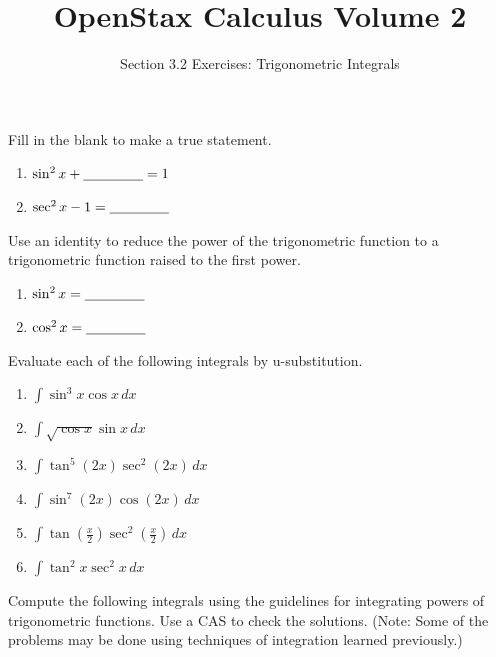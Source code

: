 \documentclass{exercises}
\title{OpenStax Calculus Volume 2}
\subtitle{Section 3.2 Exercises: Trigonometric Integrals}
\author{}
\date{}
\begin{document}
\maketitle


Fill in the blank to make a true statement.

\begin{enumerate}[start=1]
\item $\sin^{2}x+\underline{\hspace{1.5cm}}=1$
\item $\sec^{2}x-1=\underline{\hspace{1.5cm}}$
\end{enumerate}

Use an identity to reduce the power of the trigonometric function to a trigonometric function raised to the first power.

\begin{enumerate}[resume]
\item $\sin^{2}x=\underline{\hspace{1.5cm}}$
\item $\cos^{2}x=\underline{\hspace{1.5cm}}$
\end{enumerate}

Evaluate each of the following integrals by u-substitution.

\begin{enumerate}[resume]
\item $\int \sin^{3}x\cos x\,dx$
\item $\int \sqrt{\cos x}\sin x\,dx$
\item $\int \tan^{5}(2x)\sec^{2}(2x)\,dx$
\item $\int \sin^{7}(2x)\cos(2x)\,dx$
\item $\int \tan(\frac{x}{2})\sec^{2}(\frac{x}{2})\,dx$
\item $\int \tan^{2}x\sec^{2}x\,dx$
\end{enumerate}

Compute the following integrals using the guidelines for integrating powers of trigonometric functions. Use a CAS to check the solutions. (Note: Some of the problems may be done using techniques of integration learned previously.)
\end{document}
